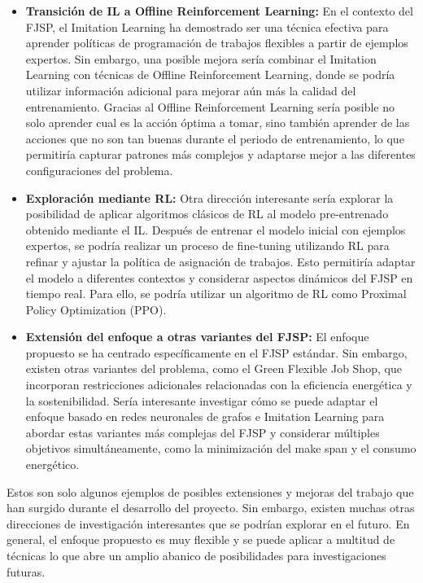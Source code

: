 \begin{itemize}
    \item \textbf{Transición de IL a Offline Reinforcement Learning:} En 
    el contexto del FJSP, el Imitation Learning ha demostrado ser una 
    técnica efectiva para aprender políticas de programación de trabajos 
    flexibles a partir de ejemplos expertos. Sin embargo, una posible mejora 
    sería combinar el Imitation Learning con técnicas de Offline Reinforcement Learning, 
    donde se podría utilizar información adicional para mejorar aún más la 
    calidad del entrenamiento. Gracias al Offline Reinforcement Learning sería posible no 
    solo aprender cual es la acción óptima a tomar, sino también aprender 
    de las acciones que no son tan buenas durante el periodo de entrenamiento, 
    lo que permitiría capturar patrones más complejos y adaptarse mejor a las 
    diferentes configuraciones del problema.
   \item \textbf{Exploración mediante RL:} Otra dirección interesante sería explorar 
   la posibilidad de aplicar algoritmos clásicos de RL al modelo pre-entrenado obtenido mediante 
   el IL. Después de entrenar el modelo inicial con ejemplos expertos, 
   se podría realizar un proceso de fine-tuning utilizando RL para refinar 
   y ajustar la política de asignación de trabajos. Esto permitiría adaptar 
   el modelo a diferentes contextos y considerar aspectos dinámicos del 
   FJSP en tiempo real. Para ello, se podría utilizar un algoritmo de
   RL como Proximal Policy Optimization (PPO).
   \item \textbf{Extensión del enfoque a otras variantes del FJSP:} El 
   enfoque propuesto se ha centrado específicamente en el FJSP estándar. 
   Sin embargo, existen otras variantes del problema, como el Green Flexible 
   Job Shop, que incorporan restricciones adicionales relacionadas con la 
   eficiencia energética y la sostenibilidad. Sería interesante investigar 
   cómo se puede adaptar el enfoque basado en redes neuronales de grafos e 
   Imitation Learning para abordar estas variantes más complejas del FJSP y 
   considerar múltiples objetivos simultáneamente, como la minimización del 
   make span y el consumo energético.
\end{itemize}

Estos son solo algunos ejemplos de posibles extensiones y mejoras del trabajo
que han surgido durante el desarrollo del proyecto. Sin embargo, existen muchas
otras direcciones de investigación interesantes que se podrían explorar en el
futuro. En general, el enfoque propuesto es muy flexible y se puede aplicar a
multitud de técnicas lo que abre un amplio abanico de posibilidades para
investigaciones futuras.